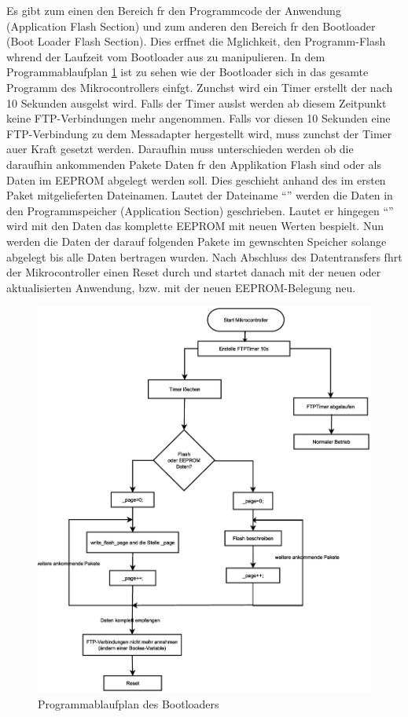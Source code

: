 \documentclass[a4paper]{book}%
\begin{document}
Es gibt zum einen den Bereich fr den Programmcode der Anwendung (Application Flash Section) und zum anderen den Bereich fr den Bootloader (Boot Loader Flash Section). 
Dies erffnet die Mglichkeit, den Programm-Flash whrend der Laufzeit vom Bootloader aus zu manipulieren.
In dem Programmablaufplan \ref{fig:bootloader} ist zu sehen wie der Bootloader sich in das gesamte Programm des Mikrocontrollers einfgt. Zunchst wird ein Timer erstellt der nach 10 Sekunden ausgelst wird. Falls der Timer auslst werden ab diesem Zeitpunkt keine FTP-Verbindungen mehr angenommen. Falls vor diesen 10 Sekunden eine FTP-Verbindung zu dem Messadapter hergestellt wird, muss zunchst der Timer auer Kraft gesetzt werden. Daraufhin muss unterschieden werden ob die daraufhin ankommenden Pakete Daten fr den Applikation Flash sind oder als Daten im EEPROM abgelegt werden soll. Dies geschieht anhand des im ersten Paket mitgelieferten Dateinamen. Lautet der Dateiname "`"' werden die Daten in den Programmspeicher (Application Section) geschrieben. Lautet er hingegen "`"' wird mit den Daten das komplette EEPROM mit neuen Werten bespielt. Nun werden die Daten der  darauf folgenden Pakete im gewnschten Speicher solange abgelegt bis alle Daten bertragen wurden. Nach Abschluss des Datentransfers fhrt der Mikrocontroller einen Reset durch und startet danach mit der neuen oder aktualisierten Anwendung, bzw. mit der neuen EEPROM-Belegung neu.

\begin{figure}[H]
	\centering
	\includegraphics[width=1.0\textwidth]{figures/bootloader.eps}
	\caption[Programmablaufplan des Bootloaders]{Programmablaufplan des Bootloaders}
	\label{fig:bootloader}
\end{figure}
\end{document}
